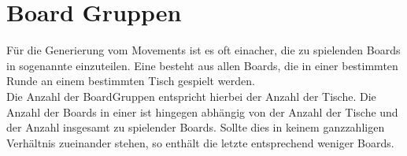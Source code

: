 \section{Board Gruppen}

\noindent
Für die Generierung vom Movements ist es oft einacher, die zu spielenden Boards in
sogenannte \bg einzuteilen. Eine \bg besteht aus allen Boards, die in einer
bestimmten Runde an einem bestimmten Tisch gespielt werden.\\[.2cm]
Die Anzahl der BoardGruppen entspricht hierbei der Anzahl der Tische.
Die Anzahl der Boards in einer \bg ist hingegen abhängig von der Anzahl der Tische und der
Anzahl insgesamt zu spielender Boards. Sollte dies in keinem ganzzahligen
Verhältnis zueinander stehen, so enthält die letzte \bg entsprechend weniger Boards.

\noindent
